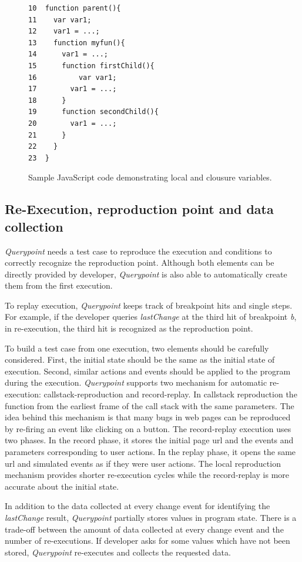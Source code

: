 \documentclass[runningheads,a4paper]{llncs}
\begin{document}
\begin{figure}[htp]
\begin{verbatim}
10  function parent(){
11    var var1;
12    var1 = ...;
13    function myfun(){
14      var1 = ...;
15      function firstChild(){
16       	var var1;
17        var1 = ...;
18      }  
19      function secondChild(){
20        var1 = ...;			      
21      }
22    }  
23  }    
\end{verbatim}
\caption{Sample JavaScript code demonstrating local and clousure variables.}
\label{fig:js-closure}
\end{figure}

\subsection{Re-Execution, reproduction point and data collection}
\textit{Querypoint} needs a test case to reproduce the
execution and conditions to correctly recognize the reproduction point. 
Although both elements can be directly provided by developer, \textit{Querypoint}
is also able to automatically create them from the first execution. 

To replay execution, \textit{Querypoint} keeps track of breakpoint hits and single steps. For example, 
if the developer queries \textit{lastChange} at the third hit of breakpoint \textit{b}, in
re-execution, the third hit is recognized as the reproduction point. 

To build a test case from one execution, two elements should be carefully 
considered. First, the initial state should be the same as the initial state
of execution. Second, similar actions and events should be applied to
the program during the execution. \textit{Querypoint} supports two mechanism
for automatic re-execution: callstack-reproduction and record-replay. In callstack reproduction the function from
the earliest frame of the call stack with the same parameters. The idea
behind this mechanism is that many bugs in web pages can be reproduced by re-firing
an event like clicking on a button. The record-replay execution uses two phases. In the record phase, it 
stores the initial page url and the events and parameters corresponding to user actions. In the replay phase, it opens
the same url and simulated events as if they were user actions. The local reproduction mechanism provides
shorter re-execution cycles while the record-replay is more accurate about the
initial state.

In addition to the data collected at every change event for identifying the \textit{lastChange}
result, \textit{Querypoint} partially stores values in program state. There is a trade-off between the amount of data collected at every change event and the number of re-executions. If developer asks for 
some values which have not been stored, \textit{Querypoint} re-executes and collects the requested data. 
\end{document}
